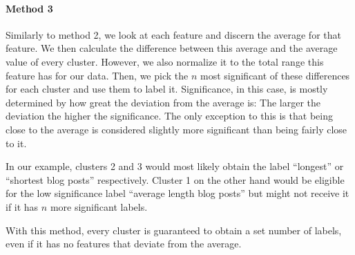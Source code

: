 \paragraph{Method 3}
Similarly to method 2, we look at each feature and discern the average for that feature.
We then calculate the difference between this average and the average value of every cluster.
However, we also normalize it to the total range this feature has for our data.
Then, we pick the $n$ most significant of these differences for each cluster and use them to label it.
Significance, in this case, is mostly determined by how great the deviation from the average is: The larger the deviation the higher the significance.
The only exception to this is that being close to the average is considered slightly more significant than being fairly close to it.

In our example, clusters 2 and 3 would most likely obtain the label ``longest'' or ``shortest blog posts'' respectively.
Cluster 1 on the other hand would be eligible for the low significance label ``average length blog posts'' but might not receive it if it has $n$ more significant labels.

With this method, every cluster is guaranteed to obtain a set number of labels, even if it has no features that deviate from the average.